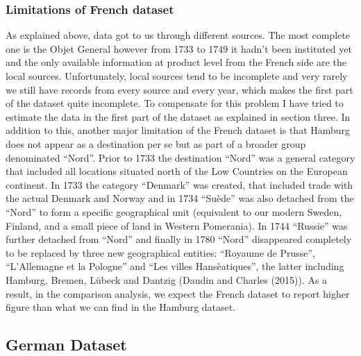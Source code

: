 \documentclass[12pt,a4paper,titlepage]{article}
\begin{document}
\subsubsection{Limitations of French dataset}
As explained above, data got to us through different sources. The most complete one is the Objet General however from 1733 to 1749 it hadn’t been instituted yet and the only available information at product level from the French side are the local sources. Unfortunately, local sources tend to be incomplete and very rarely we still have records from every source and every year, which makes the first part of the dataset quite incomplete. To compensate for this problem I have tried to estimate the data in the first part of the dataset as explained in section three.
In addition to this, another major limitation of the French dataset is that Hamburg does not appear as a destination per se but as part of a broader group denominated “Nord”. Prior to 1733 the destination “Nord” was a general category that included all locations situated north of the Low Countries on the European continent. In 1733 the category “Denmark” was created, that included trade with the actual Denmark and Norway and in 1734 “Suède” was also detached from the “Nord” to form a specific geographical unit (equivalent to our modern Sweden, Finland, and a small piece of land in Western Pomerania). In 1744 “Russie” was further detached from “Nord” and finally in 1780 “Nord” disappeared completely to be replaced by three new geographical entities: “Royaume de Prusse”, “L’Allemagne et la Pologne” and “Les villes Hansèatiques”, the latter including Hamburg, Bremen, Lübeck and Dantzig (Daudin and Charles (2015)).
As a result, in the comparison analysis, we expect the French dataset to report higher figure than what we can find in the Hamburg dataset. 

\subsection{German Dataset}
\end{document}
